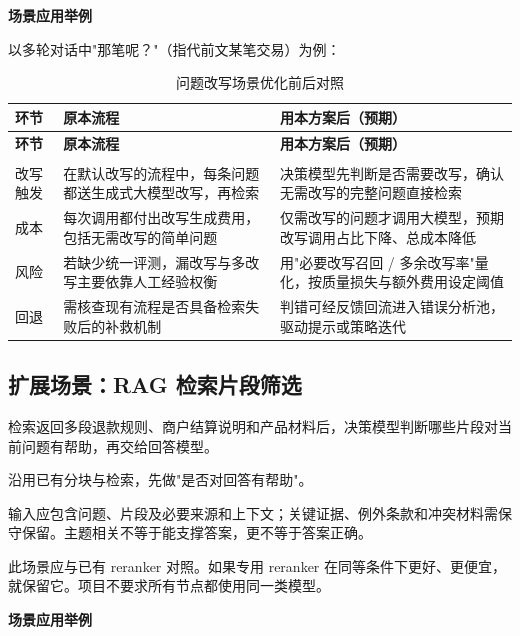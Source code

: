 \documentclass[UTF8,a4paper,11pt,fontset=windows]{ctexart}
\begin{document}
\textbf{场景应用举例}


以多轮对话中"那笔呢？"（指代前文某笔交易）为例：


{\small\setlength{\tabcolsep}{4pt}\renewcommand{\arraystretch}{1.28}
\begin{longtable}{>{\raggedright\arraybackslash}p{0.220\dimexpr\linewidth-6\tabcolsep\relax}>{\raggedright\arraybackslash}p{0.380\dimexpr\linewidth-6\tabcolsep\relax}>{\raggedright\arraybackslash}p{0.400\dimexpr\linewidth-6\tabcolsep\relax}}
\caption{问题改写场景优化前后对照}\label{tab:rewrite-flow}\\
\toprule
\textbf{环节} & \textbf{原本流程} & \textbf{用本方案后（预期）} \\
\midrule
\endfirsthead
\toprule
\textbf{环节} & \textbf{原本流程} & \textbf{用本方案后（预期）} \\
\midrule
\endhead
\midrule\multicolumn{3}{r}{\scriptsize\color{Muted}续下页}\\\endfoot
\bottomrule\endlastfoot
改写触发 & 在默认改写的流程中，每条问题都送生成式大模型改写，再检索 & 决策模型先判断是否需要改写，确认无需改写的完整问题直接检索 \\
成本 & 每次调用都付出改写生成费用，包括无需改写的简单问题 & 仅需改写的问题才调用大模型，预期改写调用占比下降、总成本降低 \\
风险 & 若缺少统一评测，漏改写与多改写主要依靠人工经验权衡 & 用"必要改写召回 / 多余改写率"量化，按质量损失与额外费用设定阈值 \\
回退 & 需核查现有流程是否具备检索失败后的补救机制 & 判错可经反馈回流进入错误分析池，驱动提示或策略迭代 \\
\end{longtable}}

\subsection{扩展场景：RAG 检索片段筛选}

检索返回多段退款规则、商户结算说明和产品材料后，决策模型判断哪些片段对当前问题有帮助，再交给回答模型。


沿用已有分块与检索，先做"是否对回答有帮助"。


输入应包含问题、片段及必要来源和上下文；关键证据、例外条款和冲突材料需保守保留。主题相关不等于能支撑答案，更不等于答案正确。


此场景应与已有 reranker 对照。如果专用 reranker 在同等条件下更好、更便宜，就保留它。项目不要求所有节点都使用同一类模型。


\textbf{场景应用举例}
\end{document}

